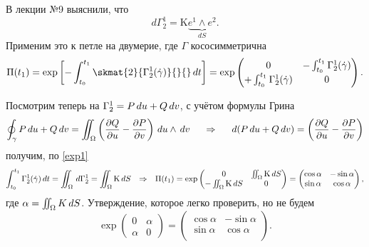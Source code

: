 В лекции №9 выяснили, что
\begin{equation*}
    d \Gamma^1_2 = \mathrm{K} 
    \underbrace{e^1 \wedge e^2}_{dS}.
\end{equation*}
Применим это к петле на двумерие, где $\Gamma$ кососимметрична
\begin{equation*}
    \Pi(t_1) = \exp\left[
        -\int_{t_0}^{t_1}
        \skmat{2}{\Gamma_2^1(\dot{\gamma})}{}{}
        \d t
    \right]  =
    \exp
    \begin{pmatrix}
        0 & -\int_{t_0}^{t_1}\Gamma_2^1(\dot{\gamma}) \\
        +\int_{t_0}^{t_1}\Gamma_2^1(\dot{\gamma}) & 0 \\
    \end{pmatrix}.
\end{equation*}

Посмотрим теперь на $\Gamma_2^1 = P\, d u + Q \, d v$, с учётом формулы Грина
\begin{equation*}
    \oint_{\gamma} P \, d u + Q \, d v = 
    \iint_\Omega
     \left(
        \frac{\partial Q}{\partial u} - \frac{\partial P}{\partial v} 
    \right) 
    \, d u \wedge \, d v
    \hspace{0.5cm} \Rightarrow \hspace{0.5cm} 
    d(P \, d u + Q \, d v) = \left(
        \frac{\partial Q}{\partial u} - \frac{\partial P}{\partial v} 
    \right)
\end{equation*}
получим, по \eqref{exp1}
\begin{equation*}
    \int_{t_0}^{t_1}
    \Gamma^1_2  (\dot{\gamma}) \, d t = 
    \iint_\Omega \, d \Gamma_2^1 = \iint_\Omega \mathrm{K} \, d S
    \hspace{0.25cm} \Rightarrow \hspace{0.25cm} 
    \Pi (t_1) = 
    \exp
    \begin{pmatrix}
        0 & \iint_\Omega \mathrm{K} \, d S \\
        -\iint_\Omega \mathrm{K} \, d S & 0
    \end{pmatrix}
    = 
    \begin{pmatrix}
        \cos \alpha & - \sin \alpha \\
        \sin \alpha & \cos \alpha \\        
    \end{pmatrix},
\end{equation*}
где $\alpha = \iint_\Omega K \, d S$.
Утверждение, которое легко проверить, но не будем
\begin{equation}
\label{exp1}
     \exp 
    \begin{pmatrix}
        0 & \alpha \\
        \alpha & 0
    \end{pmatrix} = 
    \begin{pmatrix}
        \cos \alpha & - \sin \alpha \\
        \sin \alpha & \cos \alpha \\
    \end{pmatrix}.
 \end{equation} 

